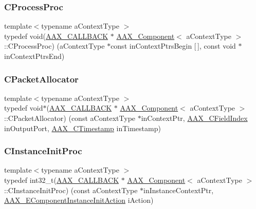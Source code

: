 \subsubsection{\texorpdfstring{CProcessProc}{CProcessProc}}
{\footnotesize\ttfamily template$<$typename a\+Context\+Type $>$ \\
typedef void(\mbox{\hyperlink{a00392_aaa22112139aa627574b1ef562f579d43}{A\+A\+X\+\_\+\+C\+A\+L\+L\+B\+A\+CK}} $\ast$ \mbox{\hyperlink{a01437}{A\+A\+X\+\_\+\+Component}}$<$ a\+Context\+Type $>$\+::C\+Process\+Proc) (a\+Context\+Type $\ast$const in\+Context\+Ptrs\+Begin \mbox{[}$\,$\mbox{]}, const void $\ast$in\+Context\+Ptrs\+End)}

\mbox{\label{a01437_ab72700098d29650fcef553e827d8f1b4}} 
\subsubsection{\texorpdfstring{CPacketAllocator}{CPacketAllocator}}
{\footnotesize\ttfamily template$<$typename a\+Context\+Type $>$ \\
typedef void$\ast$(\mbox{\hyperlink{a00392_aaa22112139aa627574b1ef562f579d43}{A\+A\+X\+\_\+\+C\+A\+L\+L\+B\+A\+CK}} $\ast$ \mbox{\hyperlink{a01437}{A\+A\+X\+\_\+\+Component}}$<$ a\+Context\+Type $>$\+::C\+Packet\+Allocator) (const a\+Context\+Type $\ast$in\+Context\+Ptr, \mbox{\hyperlink{a00392_ae807f8986143820cfb5d6da32165c9c7}{A\+A\+X\+\_\+\+C\+Field\+Index}} in\+Output\+Port, \mbox{\hyperlink{a00392_aae7325dbfa53a983f208a68cb563fba5}{A\+A\+X\+\_\+\+C\+Timestamp}} in\+Timestamp)}

\mbox{\label{a01437_adf90ef33bfecba08b4a723a85f9f2b59}} 
\subsubsection{\texorpdfstring{CInstanceInitProc}{CInstanceInitProc}}
{\footnotesize\ttfamily template$<$typename a\+Context\+Type $>$ \\
typedef int32\+\_\+t(\mbox{\hyperlink{a00392_aaa22112139aa627574b1ef562f579d43}{A\+A\+X\+\_\+\+C\+A\+L\+L\+B\+A\+CK}} $\ast$ \mbox{\hyperlink{a01437}{A\+A\+X\+\_\+\+Component}}$<$ a\+Context\+Type $>$\+::C\+Instance\+Init\+Proc) (const a\+Context\+Type $\ast$in\+Instance\+Context\+Ptr, \mbox{\hyperlink{a00491_aff5646376a3c93f032cf2400e0885023}{A\+A\+X\+\_\+\+E\+Component\+Instance\+Init\+Action}} i\+Action)}

